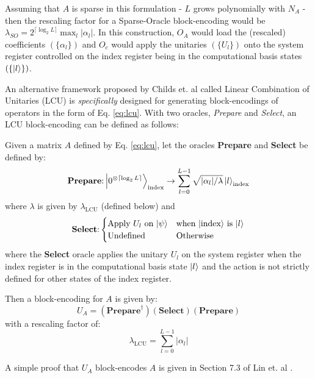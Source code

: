 Assuming that $A$ is sparse in this formulation - $L$ grows polynomially with $N_A$ - then the rescaling factor for a Sparse-Oracle block-encoding would be $\lambda_{SO} = 2^{\lceil \log_2 L \rceil} \max_{l} |\alpha_l|$.
In this construction, $O_A$ would load the (rescaled) coefficients $(\{\alpha_l\})$ and $O_c$ would apply the unitaries $(\{U_l\})$ onto the system register controlled on the index register being in the computational basis states $(\{\ket{l}\})$. 

An alternative framework proposed by Childs et. al \cite{childs2012hamiltonian} called Linear Combination of Unitaries (LCU) is \textit{specifically} designed for generating block-encodings of operators in the form of Eq. \ref{eq:lcu}. 
With two oracles, \textit{Prepare} and \textit{Select}, an LCU block-encoding can be defined as follows:
\begin{theorem}
    \label{th:lcu}
    Given a matrix $A$ defined by Eq. \ref{eq:lcu}, let the oracles \textbf{Prepare} and \textbf{Select} be defined by:
    \begin{equation}
        \label{eq:prep-state}
        \textbf{Prepare}\text{:} \ket{0^{\otimes \lceil \log_2 L \rceil}}_\text{index} \rightarrow \sum_{l=0}^{L-1} \sqrt{| \alpha_l | / \lambda} \ket{l}_\text{index}
    \end{equation}
    where $\lambda$ is given by $\lambda_\text{LCU}$ (defined below) and
    \begin{equation}
        \label{eq:select}
        \textbf{Select}\text{:} 
        \begin{cases} 
            \text{Apply $U_l$ on $\ket{\psi}$} & \text{when $\ket{\text{index}}$ is $\ket{l}$} \\
            \text{Undefined} & \text{Otherwise} \\
        \end{cases}
    \end{equation}
    where the \textbf{Select} oracle applies the unitary $U_l$ on the system register when the index register is in the computational basis state $\ket{l}$ and the action is not strictly defined for other states of the index register.

    Then a block-encoding for $A$ is given by:
    \begin{equation}
        \label{eq:lcu-be}
        U_A = (\textbf{Prepare}^\dagger) (\textbf{Select}) (\textbf{Prepare})
    \end{equation}
    with a rescaling factor of:
    \begin{equation}
        \lambda_\text{LCU} = \sum_{l=0}^{L-1} | \alpha_l |
    \end{equation}
\end{theorem}
A simple proof that $U_A$ block-encodes $A$ is given in Section 7.3 of Lin et. al \cite{lin2022lecture}.

